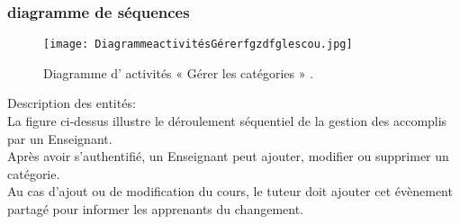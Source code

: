 \clearpage
\subsubsection{diagramme de séquences }
\begin{figure}[ht]
	\centering
	\texttt{[image: DiagrammeactivitésGérerfgzdfglescou.jpg]}
	\caption{Diagramme d' activités « Gérer les catégories » .}
	\label{fig:Diagramme d' activités  Gérer les catégories  }
\end{figure}
\FloatBarrier

{\Large \color{cyan} Description des entités:}\\
La figure ci-dessus illustre le déroulement séquentiel de la gestion des accomplis par un Enseignant.\\
Après avoir s’authentifié, un Enseignant peut ajouter, modifier ou supprimer un catégorie.\\
Au cas d’ajout ou de modification du cours, le tuteur doit ajouter cet évènement  partagé pour informer les apprenants du changement.
\clearpage





